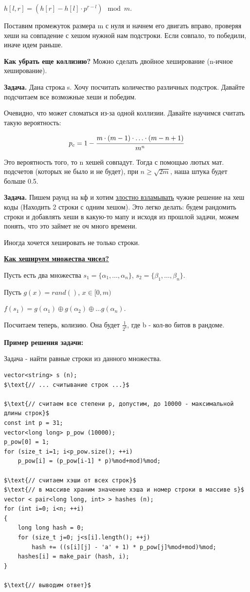\documentclass{article}
\newcommand*\xor{\mathbin{\oplus}}
\begin{document}
$h[l,r] = (h[r] - h[l]\cdot p^{r-l}) \mod m$.

Поставим промежуток размера m  с нуля и начнем его двигать вправо, проверяя хеши на совпадение с хешом нужной нам подстроки. Если совпало, то победили, иначе идем раньше.

\textbf{Как убрать еще коллизию?} Можно сделать двойное хеширование (n-ичное хеширование).

\textbf{Задача.} Дана строка s. Хочу посчитать количество различных подстрок. Давайте подсчитаем все возможные хеши  и победим. 

Очевидно, что может сломаться из-за одной коллизии. Давайте научимся считать такую вероятность:

\[p_c = 1 - \cfrac{m \cdot (m-1) \cdot \ldots \cdot (m-n+1)}{m^n}\]

Это вероятность того, то  n хешей совпадут. Тогда с помощью лютых мат. подсчетов (которых не было и не будет), при $n\geq \sqrt{2m}$, наша штука будет больше 0.5.

\textbf{Задача.} Пишем раунд на кф и хотим \uline{злостно взламывать} чужие решение на хеш коды (Находить 2 строки с одним хешом). Это легко делать: будем рандомить строки и добавлять хеши в какую-то мапу и исходя из прошлой задачи, можем понять, что это займет не оч много времени.

Иногда хочется хешировать не только строки. 

\uline{\textbf{Как хешируем множества чисел?}}

Пусть есть два множества $s_1 = \{\alpha_1,\ldots ,\alpha_n\}$, $s_2 = \{\beta_1,\ldots ,\beta_n\}$. 

Пусть $g(x) = rand()$, $x \in [0,m)$

$f(s_1) = g(\alpha_1) \xor g(\alpha_2) \xor \ldots g(\alpha_n)$.

Посчитаем теперь, колизию. Она будет $\frac{1}{2^b}$, где b - кол-во битов в рандоме.  

\textbf{Пример решения задачи:}

Задача - найти равные строки из данного множества.
\begin{lstlisting}[mathescape]
vector<string> s (n);
$\text{// ... считывание строк ...}$

$\text{// считаем все степени p, допустим, до 10000 - максимальной длины строк}$
const int p = 31;
vector<long long> p_pow (10000);
p_pow[0] = 1;
for (size_t i=1; i<p_pow.size(); ++i)
	p_pow[i] = (p_pow[i-1] * p)%mod+mod)%mod;

$\text{// считаем хэши от всех строк}$
$\text{// в массиве храним значение хэша и номер строки в массиве s}$
vector < pair<long long, int> > hashes (n);
for (int i=0; i<n; ++i)
{
	long long hash = 0;
	for (size_t j=0; j<s[i].length(); ++j)
		hash += ((s[i][j] - 'a' + 1) * p_pow[j]%mod+mod)%mod;
	hashes[i] = make_pair (hash, i);
}

$\text{// выводим ответ}$

\end{lstlisting}
\end{document}
